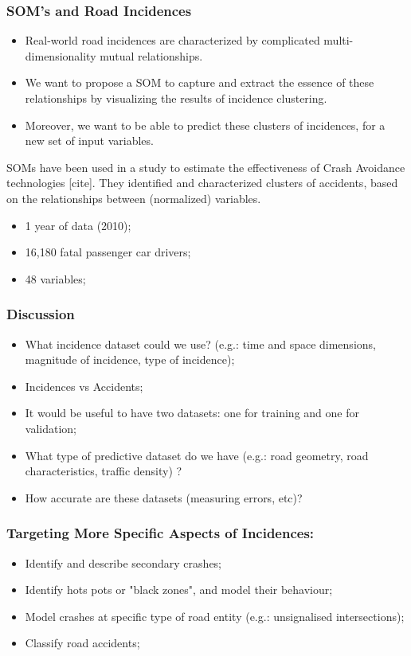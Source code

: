 \documentclass[hyperref={pdfpagelabels=true}]{beamer}
\begin{document}
\begin{frame}
\frametitle{SOM's and Road Incidences}
\begin{itemize}
\item Real-world road incidences are characterized by complicated multi-dimensionality mutual relationships.
\item We want to propose a SOM to capture and extract the essence of these relationships by visualizing the results of incidence clustering.
\item Moreover, we want to be able to predict these clusters of incidences, for a new set of input variables.
\end{itemize}
SOMs have been used in a study to estimate the effectiveness of Crash Avoidance technologies [cite]. They identified and characterized clusters of accidents, based on
the relationships between (normalized) variables.
\begin{itemize}
\item <2-> 1 year of data (2010);
\item <3-> 16,180 fatal passenger car drivers;
\item <4-> 48 variables;
\end{itemize}
\end{frame}

\begin{frame}
\frametitle{Discussion}
\begin{itemize}
\item What incidence dataset could we use? (e.g.: time and space dimensions, magnitude of incidence, type of incidence);
\item Incidences vs Accidents;
\item It would be useful to have two datasets: one for training and one for validation;
\item What type of predictive dataset do we have (e.g.: road geometry, road characteristics, traffic density) ?
\item How accurate are these datasets (measuring errors, etc)?
\end{itemize}
\end{frame}

\begin{frame}
\frametitle{Targeting More Specific Aspects of Incidences:}
\begin{itemize}
\item Identify and describe secondary crashes;
\item Identify hots pots or "black zones", and model their behaviour;
\item Model crashes at specific type of road entity (e.g.: unsignalised intersections);
\item Classify road accidents;
\end{itemize}
\end{frame}
\end{document}
